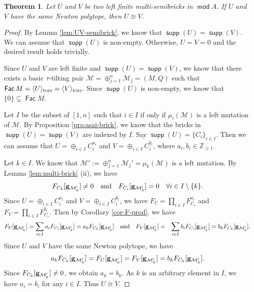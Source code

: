 \documentclass[10pt]{amsart}
\newtheorem{theorem}{Theorem}[section]
\theoremstyle{definition}
\theoremstyle{remark}
\numberwithin{equation}{section}
\def\mod{\opname{mod}\nolimits}
\newcommand{\opname}[1]{\operatorname{\mathsf{#1}}}
\newcommand{\Fac}{\opname{Fac}}
\newcommand{\supp}{\opname{supp}}
\begin{document}
\begin{theorem}
   Let $U$ and $V$ be two left finite multi-semibricks in $\mod A$. If $U$ and $V$ have the same Newton polytope, then $U\cong V$.
\end{theorem}
\begin{proof}
  By Lemma \ref{lem:UV-semibrick}, we know that $\supp (U)=\supp(V)$. We can assume that $\supp (U)$ is non-empty. Otherwise, $U=V=0$ and the desired result holds trivially.

  
Since $U$ and $V$ are left finite and $\supp (U)=\supp (V)$, we know that there exists a basic $\tau$-tilting pair $\mathcal M=\oplus_{j=1}^n\mathcal M_j=(M,Q)$ such that $\Fac M=\langle U\rangle_{\rm tors}=\langle V\rangle_{\rm tors}$. Since $\supp(U)$ is non-empty, we know that $\{0\}\subsetneq \Fac M$.

Let $I$ be the subset of $[1,n]$ such that $i\in I$ if only if $\mu_i(\mathcal M)$ is a left mutation of $\mathcal M$. By Proposition \ref{pro:asai-brick}, we know that the bricks in $\supp(U)=\supp (V)$ are indexed by $I$. Say  $\supp(U)=\{C_i\}_{i\in I}$. Then we can assume that
 $U=\oplus_{i\in I}C_i^{a_i}$ and $V=\oplus_{i\in I}C_i^{b_i}$, where $a_i, b_i\in\mathbb Z_{\geq 1}$. 

Let $k\in I$. We know that $\mathcal M':=\oplus_{j=1}^n\mathcal M_j'=\mu_k(\mathcal M)$ is a left mutation. By Lemma \ref{lem:multi-brick} (ii), we have
\[ F_{C_k}[{\bf g}_{{\mathcal M}_k'}]\neq 0 \quad \text{and}
\quad F_{C_i}[{\bf g}_{{\mathcal M}_k'}]=0 \quad \forall i\in I\setminus\{k\}.
\]
Since  $U=\oplus_{i\in I}C_i^{a_i}$ and $V=\oplus_{i\in I}C_i^{b_i}$, we have $F_U=\prod_{i\in I}F_{C_i}^{a_i}$ and $F_V=\prod_{i\in I}F_{C_i}^{b_i}$. Then by Corollary \ref{cor-F-prod}, we have
\begin{eqnarray*}
   F_U[{\bf g}_{{\mathcal M}_k'}] =\sum_{i\in I}a_iF_{C_i}[{\bf g}_{{\mathcal M}_k'}]=a_kF_{C_k}[{\bf g}_{{\mathcal M}_k'}]\quad\text{and}\quad
    F_V[{\bf g}_{{\mathcal M}_k'}] &=&\sum_{i\in I}b_iF_{C_i}[{\bf g}_{{\mathcal M}_k'}]=b_kF_{C_k}[{\bf g}_{{\mathcal M}_k'}].
\end{eqnarray*}
Since $U$ and $V$ have the same Newton polytope, we have 
\[a_kF_{C_k}[{\bf g}_{{\mathcal M}_k'}]=F_U[{\bf g}_{{\mathcal M}_k'}]=F_V[{\bf g}_{{\mathcal M}_k'}]  =b_kF_{C_k}[{\bf g}_{{\mathcal M}_k'}].\]
Since $F_{C_k}[{\bf g}_{{\mathcal M}_k'}]\neq 0$, we obtain $a_k=b_k$. As $k$ is an arbitrary element in $I$, we have $a_i=b_i$ for any $i\in I$. Thus $U\cong V$.
\end{proof}




\end{document}
